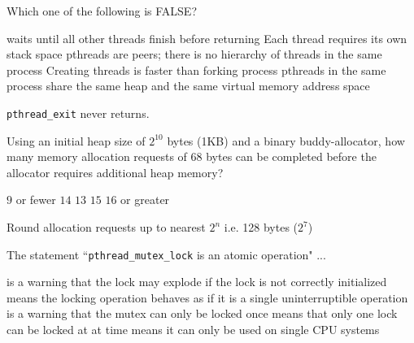 \variant
Which one of the following is FALSE?
\begin{answers}
 waits until all other threads finish before returning
\answer Each thread requires its own stack space
\answer pthreads are peers; there is no hierarchy of threads in the same process
\answer Creating threads is faster than forking process
\answer pthreads in the same process share the same heap and the same virtual memory address space
\end{answers}
\begin{solution}
 {\tt pthread_exit}  never returns.
\end{solution}



\variant
Using an initial heap size of $2^{10}$ bytes (1KB) and a binary buddy-allocator, how many memory allocation requests of 68 bytes can be completed before the allocator requires additional heap memory?
\begin{answers}
\correctanswer $9$ or fewer
\answer $14$
\answer $13$
\answer $15$
\answer $16$ or greater
\end{answers}
\begin{solution}
Round allocation requests up to nearest $2^n$ i.e. 128 bytes ($2^7$)
\end{solution}





\variant
The statement ``{\tt pthread_mutex_lock} is an atomic operation"  ...
\begin{answers}
\answer is a warning that the lock may explode if the lock is not correctly initialized
\correctanswer means the locking operation behaves as if it is a single uninterruptible operation
\answer is a warning that the mutex can only be locked once
\answer means that only one lock can be locked at at time
\answer means it can only be used on single CPU systems
\end{answers}
\begin{solution}
\end{solution}


